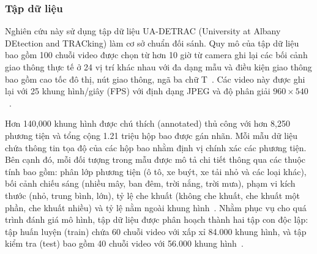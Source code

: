 \subsubsection{Tập dữ liệu}

Nghiên cứu này sử dụng tập dữ liệu UA-DETRAC (University at Albany DEtection
and TRACking) làm cơ sở chuẩn đối sánh. Quy mô của tập dữ liệu bao gồm 100
chuỗi video được chọn từ hơn 10 giờ từ camera ghi lại các bối cảnh giao thông
thực tế ở 24 vị trí khác nhau với đa dạng mẫu và điều kiện giao thông bao gồm
cao tốc đô thị, nút giao thông, ngã ba chữ T~\cite{wen2020uadetrac}. Các video
này được ghi lại với 25 khung hình/giây (FPS) với định dạng JPEG và độ phân
giải $960 \times 540$~\cite{wen2020uadetrac}.

Hơn 140,000 khung hình được chú thích (annotated) thủ công với hơn 8,250 phương
tiện và tổng cộng 1.21 triệu hộp bao được gán nhãn. Mỗi mẫu dữ liệu chứa thông
tin tọa độ của các hộp bao nhằm định vị chính xác các phương tiện. Bên cạnh đó,
mỗi đối tượng trong mẫu được mô tả chi tiết thông qua các thuộc tính bao gồm:
phân lớp phương tiện (ô tô, xe buýt, xe tải nhỏ và các loại khác), bối cảnh
chiếu sáng (nhiều mây, ban đêm, trời nắng, trời mưa), phạm vi kích thước (nhỏ,
trung bình, lớn), tỷ lệ che khuất (không che khuất, che khuất một phần, che
khuất nhiều) và tỷ lệ nằm ngoài khung hình~\cite{wen2020uadetrac}. Nhằm phục vụ
cho quá trình đánh giá mô hình, tập dữ liệu được phân hoạch thành hai tập con
độc lập: tập huấn luyện (train) chứa 60 chuỗi video với xấp xỉ 84.000 khung
hình, và tập kiểm tra (test) bao gồm 40 chuỗi video với 56.000 khung
hình~\cite{wen2020uadetrac}.
